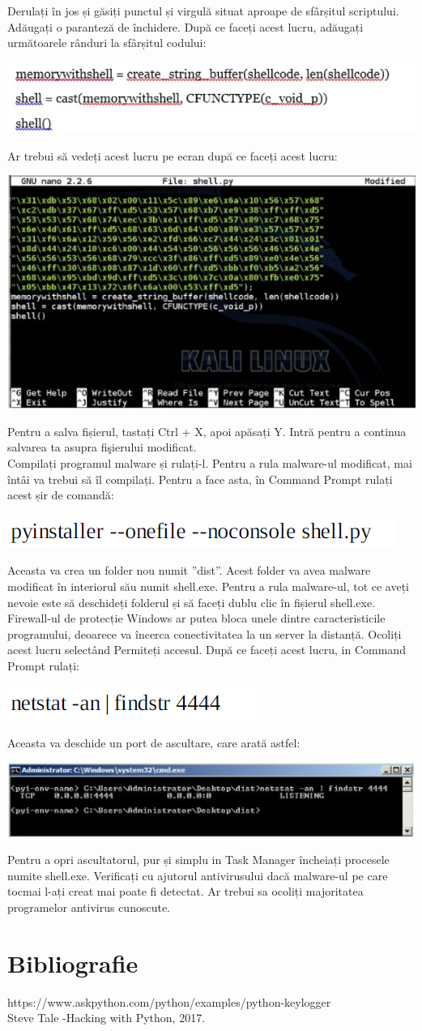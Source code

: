 \documentclass[oneside,20pt]{article}          %
\begin{document}
Derulați în jos și găsiți punctul și virgulă situat aproape de sfârșitul scriptului. Adăugați o paranteză de închidere. După ce faceți acest lucru, adăugați următoarele rânduri la sfârșitul codului:
\begin{center}
\includegraphics[height=1 cm]{15.png}
\end{center}
Ar trebui să vedeți acest lucru pe ecran după ce faceți acest lucru:
\begin{center}
\includegraphics[height=3 cm]{16.png}
\end{center}
Pentru a salva fișierul, tastați Ctrl + X, apoi apăsați Y. Intră pentru a continua salvarea ta asupra fişierului modificat.\\
Compilați programul malware și rulați-l.
Pentru a rula malware-ul modificat, mai întâi va trebui să îl compilați. Pentru a face asta, în Command Prompt rulați acest șir de comandă:
\begin{center}
\includegraphics[height=1 cm]{17.png}
\end{center}
Aceasta va crea un folder nou numit ”dist”. Acest folder va avea malware modificat
în interiorul său numit shell.exe. Pentru a rula malware-ul, tot ce aveți nevoie este să deschideți folderul și să faceți dublu clic
în fișierul shell.exe.
Firewall-ul de protecție Windows ar putea bloca unele dintre caracteristicile programului, deoarece va încerca
conectivitatea la un server la distanță. Ocoliți acest lucru selectând Permiteți accesul. După ce faceți acest lucru, in Command Prompt rulați:
\begin{center}
\includegraphics[height=1 cm]{18.png}
\end{center}
Aceasta va deschide un port de ascultare, care arată astfel:
\begin{center}
\includegraphics[height=2 cm]{19.png}
\end{center}
Pentru a opri ascultatorul, pur și simplu in Task Manager încheiați procesele numite shell.exe.
Verificați cu ajutorul antivirusului dacă malware-ul pe care tocmai l-ați creat mai poate fi detectat. Ar trebui sa
ocoliți majoritatea programelor antivirus cunoscute.

\section{Bibliografie}

https://www.askpython.com/python/examples/python-keylogger\\
 Steve Tale -Hacking with Python, 2017.
\end{document}
